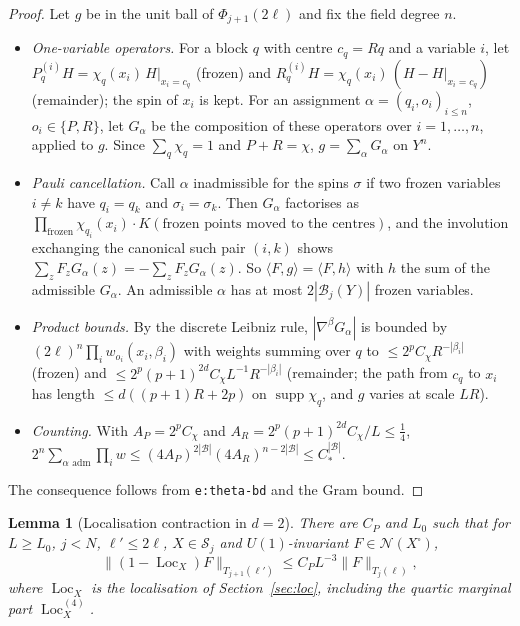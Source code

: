 \documentclass[11pt]{amsart}
\newtheorem{lemma}[theorem]{Lemma}
\theoremstyle{definition}
\theoremstyle{remark}
\numberwithin{equation}{section}
\newcommand{\cB}{\mathcal{B}}
\newcommand{\cS}{\mathcal{S}}
\newcommand{\cN}{\mathcal{N}}
\newcommand{\Loc}{\operatorname{Loc}}
\newcommand{\ip}[2]{\langle #1,#2\rangle}
\begin{document}
\begin{proof}
Let $g$ be in the unit ball of $\Phi_{j+1}(2\ell)$ and fix the field degree $n$.
\begin{itemize}
\item \emph{One-variable operators.} For a block $q$ with centre $c_q=Rq$ and a variable $i$,
  let $P^{(i)}_qH=\chi_q(x_i)\,H|_{x_i=c_q}$ (frozen) and
  $R^{(i)}_qH=\chi_q(x_i)\,(H-H|_{x_i=c_q})$ (remainder); the spin of $x_i$ is kept. For an
  assignment $\alpha=(q_i,o_i)_{i\le n}$, $o_i\in\{P,R\}$, let $G_\alpha$ be the composition of
  these operators over $i=1,\dots,n$, applied to $g$. Since $\sum_q\chi_q=1$ and $P+R=\chi$,
  $g=\sum_\alpha G_\alpha$ on $Y^n$.
\item \emph{Pauli cancellation.} Call $\alpha$ inadmissible for the spins $\sigma$ if two
  frozen variables $i\ne k$ have $q_i=q_k$ and $\sigma_i=\sigma_k$. Then $G_\alpha$ factorises
  as $\prod_{\text{frozen}}\chi_{q_i}(x_i)\cdot K(\text{frozen points moved to the centres})$,
  and the involution exchanging the canonical such pair $(i,k)$ shows
  $\sum_zF_zG_\alpha(z)=-\sum_zF_zG_\alpha(z)$. So $\ip Fg=\ip Fh$ with $h$ the sum of the
  admissible $G_\alpha$. An admissible $\alpha$ has at most $2|\cB_j(Y)|$ frozen variables.
\item \emph{Product bounds.} By the discrete Leibniz rule, $|\nabla^\beta G_\alpha|$ is bounded
  by $(2\ell)^n\prod_iw_{o_i}(x_i,\beta_i)$ with weights summing over $q$ to
  $\le2^pC_\chi R^{-|\beta_i|}$ (frozen) and $\le2^p(p+1)^{2d}C_\chi L^{-1}R^{-|\beta_i|}$
  (remainder; the path from $c_q$ to $x_i$ has length $\le d((p+1)R+2p)$ on
  $\operatorname{supp}\chi_q$, and $g$ varies at scale $LR$).
\item \emph{Counting.} With $A_P=2^pC_\chi$ and $A_R=2^p(p+1)^{2d}C_\chi/L\le\frac14$,
  $2^n\sum_{\alpha\text{ adm}}\prod_iw\le(4A_P)^{2|\cB|}(4A_R)^{n-2|\cB|}\le C_*^{|\cB|}$.
\end{itemize}
The consequence follows from \texttt{e:theta-bd} and the Gram bound.
\end{proof}

\begin{lemma}[Localisation contraction in $d=2$]\label{lem:loc2}
There are $C_P$ and $L_0$ such that for $L\ge L_0$, $j<N$, $\ell'\le2\ell$, $X\in\cS_j$ and
$U(1)$-invariant $F\in\cN(X^\square)$,
\[
  \|(1-\Loc_X)F\|_{T_{j+1}(\ell')}\le C_PL^{-3}\|F\|_{T_j(\ell)} ,
\]
where $\Loc_X$ is the localisation of Section~\ref{sec:loc}, \emph{including the quartic
marginal part} $\Loc^{(4)}_X$.
\end{lemma}
\end{document}
